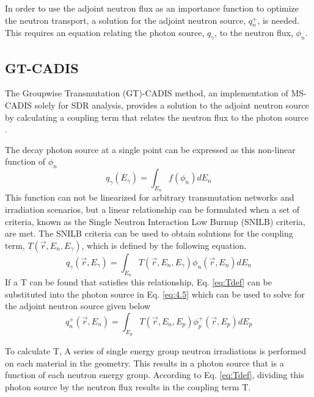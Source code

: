 In order to use the adjoint neutron flux as an importance function to optimize
the neutron transport, a solution for the adjoint neutron source, $q_n^{+}$, is needed.
This requires an equation
relating the photon source, $q_\gamma$, to the neutron flux, $\phi_n$.

\subsection{GT-CADIS}
The Groupwise Transmutation (GT)-CADIS method, an implementation of MS-CADIS
solely for SDR analysis, provides a solution to the adjoint neutron source 
by calculating a coupling term that relates the neutron flux to the photon 
source \cite{gtcadis}.

The decay photon source at a single point
can be
expressed as this non-linear function of $\phi_n$ 
\begin{equation} \label{eq:4.8}
	q_{\gamma}(E_{\gamma}) = \int_{E_n} f(\phi_{n}) dE_{n}
\end{equation}
This function can not be linearized for arbitrary transmutation networks
and irradiation scenarios, but a linear relationship can
be formulated when a set of criteria, known as the Single Neutron Interaction
Low Burnup (SNILB) criteria, are met.
The SNILB criteria can be used to obtain solutions for the coupling term, 
$T(\overrightarrow{r}, E_{n}, E_{\gamma})$, which is defined by the following equation.
\begin{equation} \label{eq:Tdef}
	q_{\gamma}(\overrightarrow{r}, E_{\gamma}) = 
	\int_{E_n}T(\overrightarrow{r}, E_{n}, E_{\gamma})
	\phi_{n}(\overrightarrow{r}, E_{n}) dE_{n}
\end{equation}
If a T can be found that satisfies this relationship, Eq. \ref{eq:Tdef} can be substituted into
the photon source in Eq. \ref{eq:4.5} which can
be used to solve for the adjoint neutron source given below %
\begin{equation} \label{eq:gt_adj_nsrc}
	q_{n}^{+}(\overrightarrow{r},E_{n})
        = \int_{E_p}T(\overrightarrow{r}, E_{n}, E_{p})
	\phi_{p}^{+}(\overrightarrow{r}, E_{p}) dE_{p}
\end{equation}



To calculate T, 
A series of single energy group neutron irradiations is performed on each material in
the geometry.  
This results in
a photon source that is a function of each neutron energy group.  According to 
Eq. \ref{eq:Tdef}, dividing this
photon source by the neutron flux results in the coupling term T.

